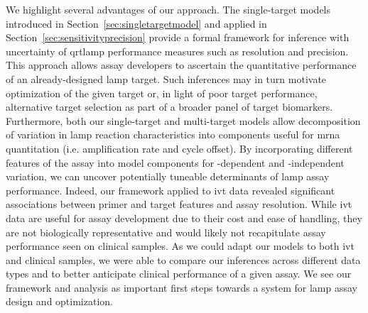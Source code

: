 \documentclass[../thesis.tex]{subfiles}
\begin{document}
We highlight several advantages of our approach. The single-target models introduced in Section~\ref{sec:singletargetmodel} and applied in Section~\ref{sec:sensitivityprecision} provide a formal framework for inference with uncertainty of \gls{qrtlamp} performance measures such as resolution and precision. This approach allows assay developers to ascertain the quantitative performance of an already-designed \gls{lamp} target. Such inferences may in turn motivate optimization of the given target or, in light of poor target performance, alternative target selection as part of a broader panel of target biomarkers. Furthermore, both our single-target and multi-target models allow decomposition of variation in \gls{lamp} reaction characteristics into components useful for \gls{mrna} quantitation (i.e. amplification rate and cycle offset). By incorporating different features of the assay into model components for -dependent and -independent variation, we can uncover potentially tuneable determinants of \gls{lamp} assay performance. Indeed, our framework applied to \gls{ivt}  data revealed significant associations between primer and target features and assay resolution. While \gls{ivt}  data are useful for assay development due to their cost and ease of handling, they are not biologically representative and would likely not recapitulate assay performance seen on clinical samples. As we could adapt our models to both \gls{ivt}  and clinical samples, we were able to compare our inferences across different data types and to better anticipate clinical performance of a given assay. We see our framework and analysis as important first steps towards a system for \gls{lamp} assay design and optimization.
\end{document}
